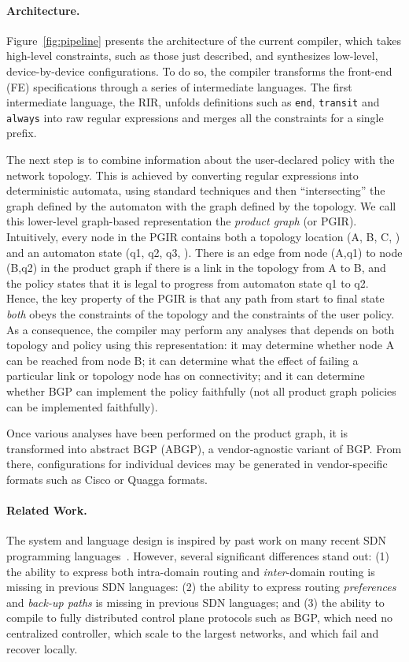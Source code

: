 \paragraph*{Architecture.}
Figure~\ref{fig:pipeline} presents the architecture of the
current \Propane compiler, which takes high-level constraints, such as those
just described, and synthesizes low-level, device-by-device configurations.  
To do so, the compiler transforms the front-end (FE) specifications through
a series of intermediate languages.  The first intermediate language, the
RIR, unfolds definitions such as \texttt{end}, \texttt{transit} and \texttt{always} into raw regular expressions and merges all the constraints for a single
prefix.  

The next step is to combine information about
the user-declared policy with the network topology.
This is achieved by converting regular expressions into deterministic
automata, using standard techniques and then ``intersecting'' the graph
defined by the automaton with the graph defined by the topology.
We call this lower-level graph-based representation the \emph{product graph} (or PGIR).
Intuitively, every node in the PGIR contains both a topology location
(A, B, C, \etc) and an automaton state (q1, q2, q3, \etc).  There is an
edge from node (A,q1) to node (B,q2) in the product graph if there is
a link in the topology from A to B, and the \Propane policy states that
it is legal to progress from automaton state q1 to q2.  Hence,
the key property of the PGIR is that any path from start to final state
\emph{both} obeys the constraints of the topology and the constraints
of the user policy.  As a consequence, the compiler may perform any
analyses that depends on both topology and policy using this representation:  
it may determine whether node A can be reached from node B; it can determine
what the effect of failing a particular link or topology node has on 
connectivity; and it can determine whether BGP can implement the policy
faithfully (not all product graph policies can be implemented faithfully).

Once various analyses have been performed on the product graph, it is
transformed into abstract BGP (ABGP), a vendor-agnostic variant of BGP.
From there, configurations for individual devices may be generated in
vendor-specific formats such as Cisco or Quagga formats.

\paragraph*{Related Work.}
The \Propane system and language design is inspired by past work on many 
recent SDN programming
languages~\cite{frenetic,pyretic,flowlog,merlin,netkat,kinetic,pga}.
However, several significant differences stand out:  (1) the ability to express
both intra-domain routing and \emph{inter}-domain routing is missing in
previous SDN languages: 
(2) the ability to express routing \emph{preferences} and 
\emph{back-up paths} is missing in
previous SDN languages;
and (3) the ability to compile to fully distributed control plane
protocols such as BGP, which need no centralized controller, which
scale to the largest networks, and which fail and recover locally.

